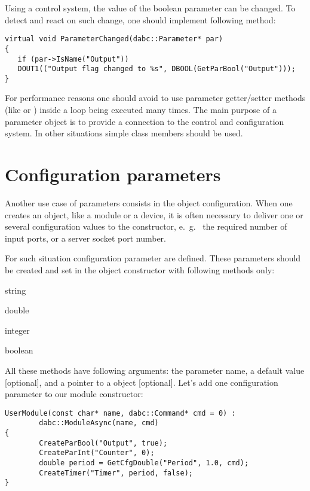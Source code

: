 Using a control system, the value of the boolean parameter can be changed. 
To detect and react on such change,
one should implement following method: 
 
\begin{verbatim}
virtual void ParameterChanged(dabc::Parameter* par) 
{
   if (par->IsName("Output")) 
   DOUT1(("Output flag changed to %s", DBOOL(GetParBool("Output")));
}
\end{verbatim}

For performance reasons one should avoid to use parameter getter/setter methods 
(like   or ) inside a loop 
being executed many times. The main purpose of a parameter
object is to provide a connection to the control and configuration system.
In other situations simple class members should be used.


\section{Configuration parameters}
\label{prog_setup_configurationparameter}
Another use case of parameters consists in the object configuration.
When one creates an object, like a module or a device, 
it is often necessary to deliver one or several configuration values 
to the constructor, e.~g.~ the required
number of input ports, or a server socket port number. 

For such situation configuration parameter are defined.
These parameters should be created and set 
in the object constructor with following methods only:


\bdes
\item[GetCfgStr]  string
\item[GetCfgDouble]   double 
\item[GetCfgInt]   integer
\item[GetCfgBool]   boolean 
\edes

All these methods have following arguments: the parameter name, 
a default value [optional], and a pointer to a  object [optional].
Let's add one configuration parameter to our module constructor:

\begin{verbatim}
UserModule(const char* name, dabc::Command* cmd = 0) : 
        dabc::ModuleAsync(name, cmd)
{
        CreateParBool("Output", true);
        CreateParInt("Counter", 0);
        double period = GetCfgDouble("Period", 1.0, cmd);
        CreateTimer("Timer", period, false);
}
\end{verbatim}

